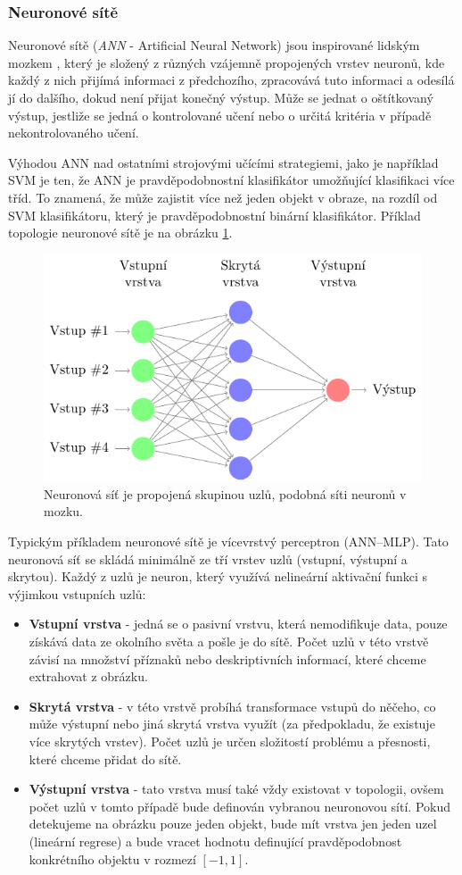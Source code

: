 \subsubsection*{Neuronové sítě}
Neuronové sítě (\textit{ANN} - Artificial Neural Network) jsou inspirované lidským mozkem \cite{ann}, který je složený z různých vzájemně propojených vrstev neuronů, kde každý z nich přijímá informaci z předchozího, zpracovává tuto informaci a odesílá jí do dalšího, dokud není přijat konečný výstup. Může se jednat o oštítkovaný výstup, jestliže se jedná o kontrolované učení nebo o určitá kritéria v případě nekontrolovaného učení.

Výhodou ANN nad ostatními strojovými učícími strategiemi, jako je například SVM je ten, že ANN je pravděpodobnostní klasifikátor umožňující klasifikaci více tříd. To znamená, že může zajistit více než jeden objekt v obraze, na rozdíl od SVM klasifikátoru, který je pravděpodobnostní binární klasifikátor. Příklad topologie neuronové sítě je na obrázku \ref{fig:ann}. 
\begin{figure}[H]
\centering
\includegraphics[width=.8\linewidth]{figures/ann.pdf}
\caption{Neuronová síť je propojená skupinou uzlů, podobná síti neuronů v mozku.}
\label{fig:ann}
\end{figure}

Typickým příkladem neuronové sítě je vícevrstvý perceptron (ANN--MLP). Tato neuronová síť se skládá minimálně ze tří vrstev uzlů (vstupní, výstupní a skrytou). Každý z uzlů je neuron, který využívá nelineární aktivační funkci s výjimkou vstupních uzlů:
\begin{itemize}
  \item{\textbf{Vstupní vrstva} - jedná se o pasivní vrstvu, která nemodifikuje data, pouze získává data ze okolního světa a pošle je do sítě. Počet uzlů v této vrstvě závisí na množství příznaků nebo deskriptivních informací, které chceme extrahovat z obrázku.}
  \item{\textbf{Skrytá vrstva} - v této vrstvě probíhá transformace vstupů do něčeho, co může výstupní nebo jiná skrytá vrstva využít (za předpokladu, že existuje více skrytých vrstev). Počet uzlů je určen složitostí problému a přesnosti, které chceme přidat do sítě. }
  \item{\textbf{Výstupní vrstva} - tato vrstva musí také vždy existovat v topologii, ovšem počet uzlů v tomto případě bude definován vybranou neuronovou sítí. Pokud detekujeme na obrázku pouze jeden objekt, bude mít vrstva jen jeden uzel (lineární regrese) a bude vracet hodnotu definující pravděpodobnost konkrétního objektu v rozmezí $[-1,1]$.}
\end{itemize}

